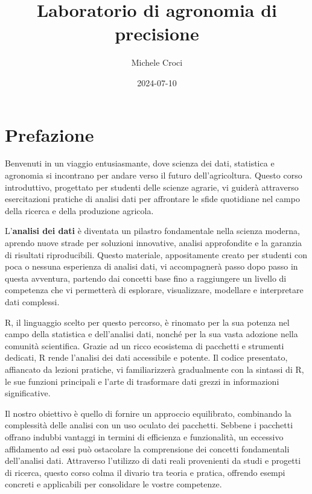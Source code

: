 \documentclass[
]{book}
\title{Laboratorio di agronomia di precisione}
\author{Michele Croci}
\date{2024-07-10}
\theoremstyle{definition}
\theoremstyle{definition}
\theoremstyle{definition}
\theoremstyle{definition}
\theoremstyle{remark}
\begin{document}
\maketitle

{
\setcounter{tocdepth}{1}
\tableofcontents
}
\hypertarget{prefazione}{%
\chapter{Prefazione}\label{prefazione}}

Benvenuti in un viaggio entusiasmante, dove scienza dei dati, statistica e agronomia si incontrano per andare verso il futuro dell'agricoltura. Questo corso introduttivo, progettato per studenti delle scienze agrarie, vi guiderà attraverso esercitazioni pratiche di analisi dati per affrontare le sfide quotidiane nel campo della ricerca e della produzione agricola.

L'\textbf{analisi dei dati} è diventata un pilastro fondamentale nella scienza moderna, aprendo nuove strade per soluzioni innovative, analisi approfondite e la garanzia di risultati riproducibili. Questo materiale, appositamente creato per studenti con poca o nessuna esperienza di analisi dati, vi accompagnerà passo dopo passo in questa avventura, partendo dai concetti base fino a raggiungere un livello di competenza che vi permetterà di esplorare, visualizzare, modellare e interpretare dati complessi.

R, il linguaggio scelto per questo percorso, è rinomato per la sua potenza nel campo della statistica e dell'analisi dati, nonché per la sua vasta adozione nella comunità scientifica. Grazie ad un ricco ecosistema di pacchetti e strumenti dedicati, R rende l'analisi dei dati accessibile e potente. Il codice presentato, affiancato da lezioni pratiche, vi familiarizzerà gradualmente con la sintassi di R, le sue funzioni principali e l'arte di trasformare dati grezzi in informazioni significative.

Il nostro obiettivo è quello di fornire un approccio equilibrato, combinando la complessità delle analisi con un uso oculato dei pacchetti. Sebbene i pacchetti offrano indubbi vantaggi in termini di efficienza e funzionalità, un eccessivo affidamento ad essi può ostacolare la comprensione dei concetti fondamentali dell'analisi dati. Attraverso l'utilizzo di dati reali provenienti da studi e progetti di ricerca, questo corso colma il divario tra teoria e pratica, offrendo esempi concreti e applicabili per consolidare le vostre competenze.
\end{document}
